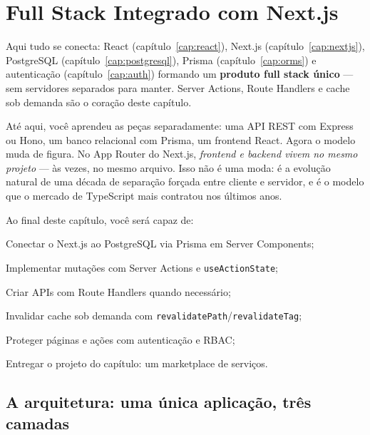 \chapter{Full Stack Integrado com Next.js}
\label{cap:fullstack}

\begin{caixaconceito}
Aqui tudo se conecta: React (capítulo~\ref{cap:react}), Next.js
(capítulo~\ref{cap:nextjs}), PostgreSQL (capítulo~\ref{cap:postgresql}),
Prisma (capítulo~\ref{cap:orms}) e autenticação (capítulo~\ref{cap:auth})
formando um \textbf{produto full stack único} — sem servidores separados para
manter. Server Actions, Route Handlers e cache sob demanda são o coração deste
capítulo.
\end{caixaconceito}

Até aqui, você aprendeu as peças separadamente: uma API REST com Express ou
Hono, um banco relacional com Prisma, um frontend React. Agora o modelo muda de
figura. No App Router do Next.js, \emph{frontend e backend vivem no mesmo
projeto} — às vezes, no mesmo arquivo. Isso não é uma moda: é a evolução
natural de uma década de separação forçada entre cliente e servidor, e é o
modelo que o mercado de TypeScript mais contratou nos últimos anos.

Ao final deste capítulo, você será capaz de:
\begin{objetivos}
  \item Conectar o Next.js ao PostgreSQL via Prisma em Server Components;
  \item Implementar mutações com Server Actions e \texttt{useActionState};
  \item Criar APIs com Route Handlers quando necessário;
  \item Invalidar cache sob demanda com \texttt{revalidatePath}/\texttt{revalidateTag};
  \item Proteger páginas e ações com autenticação e RBAC;
  \item Entregar o projeto do capítulo: um marketplace de serviços.
\end{objetivos}

\section{A arquitetura: uma única aplicação, três camadas}

